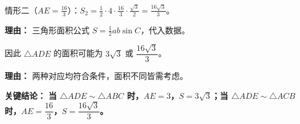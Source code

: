 \begin{examplebox}
\begin{description}[style=nextline, leftmargin=2.8em, labelsep=0.5em, itemsep=0.45em]
							情形二（$AE=\frac{16}{3}$）：$S_2=\frac12\cdot4\cdot\frac{16}{3}\cdot\frac{\sqrt3}{2}=\frac{16\sqrt3}{3}$。
							\par\textbf{理由：}
							三角形面积公式 $S=\frac12ab\sin C$，代入数据。

						\item[\textbf{第四步（给出结论）：}]
							因此 $\triangle ADE$ 的面积可能为 $3\sqrt3$ 或 $\dfrac{16\sqrt3}{3}$。
							\par\textbf{理由：}
							两种对应均符合条件，面积不同皆需考虑。
					\end{description}

					\textbf{\textcolor{CExample}{关键结论：}}
					\textbf{当 $\triangle ADE\sim\triangle ABC$ 时，$AE=3$，$S=3\sqrt3$；当 $\triangle ADE\sim\triangle ACB$ 时，$AE=\dfrac{16}{3}$，$S=\dfrac{16\sqrt3}{3}$。}
				\end{examplebox}
